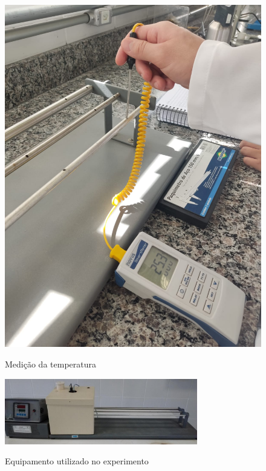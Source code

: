 \documentclass[12pt,openright,twoside,a4paper]{abntex2}
\begin{document}
\begin{figure}[H]
	\caption{Medição da temperatura}
	\centering
	\includegraphics[scale=0.2]{figura3.jpg}
	\label{fig:Figura3}
\end{figure}

\begin{figure}[H]
	\caption{Equipamento utilizado no experimento}
	\centering
	\includegraphics[width=0.75\textwidth]{figura4.jpg}
	\label{fig:Figura4}
\end{figure}
\end{document}
